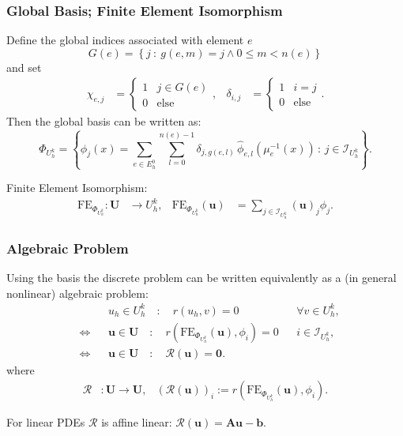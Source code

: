 \begin{frame}
\frametitle{Global Basis; Finite Element Isomorphism}
Define the global indices associated with element $e$
\begin{equation*}
G(e) = \left\{ j \ : \ g(e,m) = j \wedge 0 \leq m < n(e) \right\}
\end{equation*}
and set
\begin{align*}
\chi_{e,j} &= \left\{ \begin{array}{ll}
1 & j \in G(e) \\
0 & \text{else}
\end{array} \right., &
\delta_{i,j} &= \left\{ \begin{array}{ll}
1 & i=j  \\
0 & \text{else}
\end{array} \right. .
\end{align*}
Then the global basis can be written as:
\begin{equation*}
\Phi_{U_h^k} = \left\{ \phi_j(x) = \sum_{e\in E_h^0} \sum_{l=0}^{n(e)-1} \delta_{j,g(e,l)} \, \hat{\phi}_{e,l}(\mu_e^{-1}(x))  
\, : \, j \in \mathcal{I}_{U_h^k} \right\}.
\end{equation*}

Finite Element Isomorphism:
\begin{align*}
\text{FE}_{\Phi_{U_h^k}} : \mathbf{U} &\to U_h^k, &
\text{FE}_{\Phi_{U_h^k}}(\mathbf{u}) &= \sum_{j\in \mathcal{I}_{U_h^k}} (\mathbf{u})_j \phi_j.
\end{align*}
\end{frame}

\begin{frame}
\frametitle{Algebraic Problem}
Using the basis the discrete problem can be written equivalently as a (in general nonlinear) algebraic problem:
\begin{align*}
&&& u_h \in U_h^k \quad : \quad r(u_h,v) = 0 && \forall v \in U_h^k,\\
&\Leftrightarrow && \mathbf{u}\in\mathbf{U} \quad : \quad
r\left(\text{FE}_{\Phi_{U_h^k}}(\mathbf{u}),\phi_i\right) = 0 &&
i\in\mathcal{I}_{U_h^k}, \\
&\Leftrightarrow && \mathbf{u}\in\mathbf{U} \quad : \quad
\mathcal{R}(\mathbf{u}) = \mathbf{0}.
\end{align*}
where
\begin{align*}
\mathcal{R} &: \mathbf{U} \to \mathbf{U}, &
\left(\mathcal{R}(\mathbf{u}) \right)_i :=  r\left(\text{FE}_{\Phi_{U_h^k}}(\mathbf{u}),\phi_i\right) .
\end{align*}

For linear PDEs $\mathcal{R}$ is affine linear: $\mathcal{R}(\mathbf{u}) = \mathbf{A} \mathbf{u} - \mathbf{b}$.
\end{frame}

